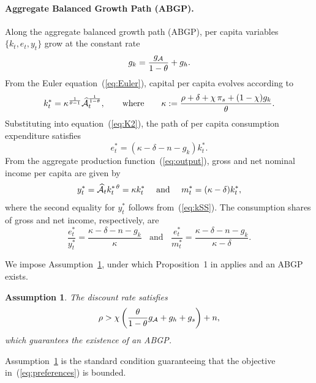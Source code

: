 \documentclass[12pt,a4paper]{article}
\newtheorem{assumption}{Assumption}
\def\equiv{:=}  %
\begin{document}
\paragraph{Aggregate Balanced Growth Path (ABGP).}

Along the aggregate balanced growth path (ABGP), per capita variables \( \{k_t, e_t, y_t\} \) grow at the constant rate
\[
g_k = \frac{g_{\cal A}}{1 - \theta} + g_h.
\]
From the Euler equation~(\ref{eq:Euler}),  capital per capita evolves according to
\begin{equation}\label{eq:kSS}
k_t^{*} = \kappa^{\frac{1}{\theta - 1}} \widehat{\cal A}_t^{\frac{1}{1 - \theta}},
\qquad \text{where} \qquad
\kappa \equiv \frac{\rho + \delta + \chi \, \pi_s + (1 - \chi) g_k}{\theta} .
\end{equation}
Substituting into equation~(\ref{eq:K2}), the path of per capita consumption expenditure satisfies\begin{equation}
e_t^* = (\kappa - \delta - n - g_k) k_t^*.
\end{equation}
From the aggregate production function~(\ref{eq:output}), gross and net nominal income per capita are given by
\begin{equation}
y_t^* = \widehat{\cal A}_t k_t^{*\,\theta} = \kappa k_t^*
\ \ \ \ \text{and}\ \ \ \
m_t^* = (\kappa - \delta)k_t^* ,
\end{equation}
where the second equality for \( y_t^* \) follows from~(\ref{eq:kSS}).
The consumption shares of gross and net income, respectively, are
\begin{equation}\label{eq:se}
\frac{e_t^*}{y_t^*} = \frac{\kappa - \delta - n - g_k}{\kappa}
\ \ \ \ \text{and}\ \ \ \ 
\frac{e_t^*}{m_t^*} = \frac{\kappa - \delta - n - g_k}{\kappa-\delta} .
\end{equation}

We impose Assumption~\ref{ass:existence}, under which Proposition~1 in 
\cite{herrendorf_rogerson_valentinyi_2021} applies and an ABGP exists.

\begin{assumption}\label{ass:existence}
The discount rate satisfies 
\[
\rho > \chi \left(\frac{\theta}{1-\theta} g_{\cal A} + g_h + g_s \right) + n ,
\]
which guarantees the existence of an ABGP.
\end{assumption}

\noindent Assumption~\ref{ass:existence} is the standard condition guaranteeing that the objective in~(\ref{eq:preferences}) is bounded.
\end{document}
